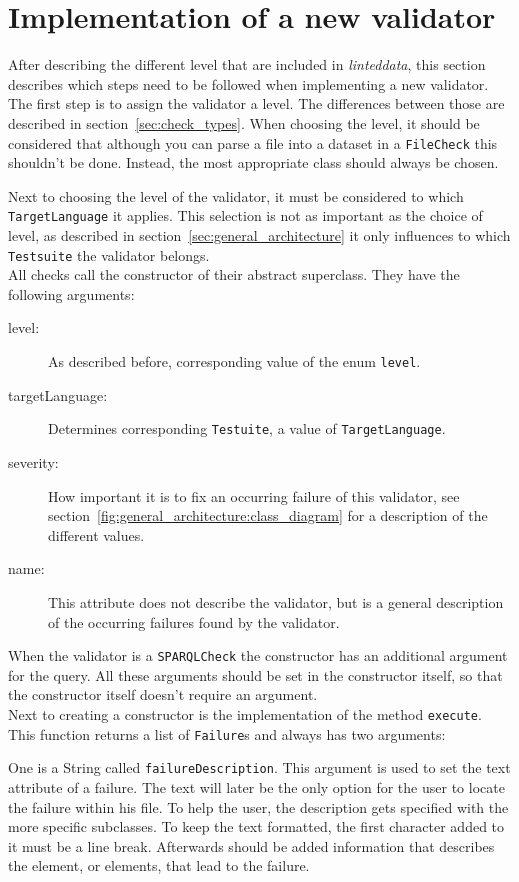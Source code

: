 \documentclass[11pt,a4paper]{article}
\newcommand{\function}[1]{\texttt{#1}}
\newcommand{\class}[1]{\texttt{#1}}
\newcommand{\enum}[1]{\texttt{#1}}
\newcommand{\toolname}{\textit{linteddata}}
\begin{document}
\section{Implementation of a new validator}
%
After describing the different level that are included in \toolname , this section describes which steps need to be followed when implementing a new validator. 
\\
The first step is to assign the validator a level. 
The differences between those are described in section~\ref{sec:check_types}. 
When choosing the level, it should be considered that although you can parse a file into a dataset in a \class{FileCheck} this shouldn't be done. 
Instead, the most appropriate class should always be chosen. 

Next to choosing the level of the validator, it must be considered to which \enum{TargetLanguage} it applies. 
This selection is not as important as the choice of level, as described in section~\ref{sec:general_architecture} it only influences to which \class{Testsuite} the validator belongs. 
\\
All checks call the constructor of their abstract superclass. 
They have the following arguments: 
\begin{description}
\item[level:] As described before, corresponding value of the enum \enum{level}.
\item[targetLanguage:] Determines corresponding \class{Testuite}, a value of \enum{TargetLanguage}.
\item[severity:] How important it is to fix an occurring failure of this validator, see section~\ref{fig:general_architecture:class_diagram} for a description of the different values. 
\item[name:] This attribute does not describe the validator, but is a general description of the occurring failures found by the validator. 
\end{description}
%
When the validator is a \class{SPARQLCheck} the constructor has an additional argument for the query. 
All these arguments should be set in the constructor itself, so that the constructor itself doesn't require an argument. 
\\
Next to creating a constructor is the implementation of the method \function{execute}. 
This function returns a list of \class{Failure}s and always has two arguments: 

One is a String called \texttt{failureDescription}. 
This argument is used to set the text attribute of a failure. 
The text will later be the only option for the user to locate the failure within his file. 
To help the user, the description gets specified with the more specific subclasses. 
To keep the text formatted, the first character added to it must be a line break. 
Afterwards should be added information that describes the element, or elements, that lead to the failure. 
\end{document}
